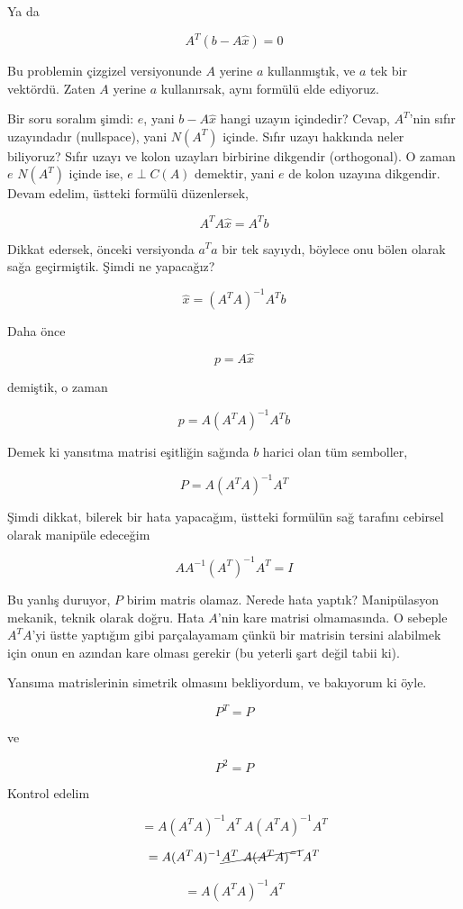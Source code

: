 \documentclass[12pt,fleqn]{article}\usepackage{../../common}
\begin{document}
Ya da

$$ A^T(b - A\hat{x})  = 0 $$

Bu problemin çizgizel versiyonunde $A$ yerine $a$ kullanmıştık, ve $a$ tek
bir vektördü. Zaten $A$ yerine $a$ kullanırsak, aynı formülü elde
ediyoruz. 

Bir soru soralım şimdi: $e$, yani $b - A\hat{x}$ hangi uzayın içindedir?
Cevap, $A^T$'nin sıfır uzayındadır (nullspace), yani $N(A^T)$ içinde. Sıfır
uzayı hakkında neler biliyoruz? Sıfır uzayı ve kolon uzayları birbirine
dikgendir (orthogonal). O zaman $e$ $N(A^T)$ içinde ise, $e \perp C(A)$
demektir, yani $e$ de kolon uzayına dikgendir. Devam edelim, üstteki
formülü düzenlersek,

$$ A^TA\hat{x} = A^Tb $$

Dikkat edersek, önceki versiyonda $a^Ta$ bir tek sayıydı, böylece onu
bölen olarak sağa geçirmiştik. Şimdi ne yapacağız? 

$$ \hat{x} = (A^TA)^{-1}A^Tb $$

Daha önce 

$$ p = A\hat{x} $$

demiştik, o zaman 

$$ p = A(A^TA)^{-1}A^Tb $$

Demek ki yansıtma matrisi eşitliğin sağında $b$ harici olan tüm semboller, 

$$ P = A(A^TA)^{-1}A^T $$

Şimdi dikkat, bilerek bir hata yapacağım, üstteki formülün sağ tarafını
cebirsel olarak manipüle edeceğim

$$  AA^{-1}(A^T)^{-1}A^T = I$$

Bu yanlış duruyor, $P$ birim matris olamaz. Nerede hata yaptık?
Manipülasyon mekanik, teknik olarak doğru. Hata $A$'nin kare matrisi
olmamasında. O sebeple $A^TA$'yi üstte yaptığım gibi parçalayamam çünkü
bir matrisin tersini alabilmek için onun en azından kare olması gerekir (bu
yeterli şart değil tabii ki). 

Yansıma matrislerinin simetrik olmasını bekliyordum, ve bakıyorum ki öyle. 

$$ P^T = P $$

ve 

$$ P^2 = P $$

Kontrol edelim

$$=  A(A^TA)^{-1}A^T \ A(A^TA)^{-1}A^T $$

$$=  A(A^TA)^{-1}\cancel{A^T \ A(A^TA)^{-1}}A^T $$

$$=  A(A^TA)^{-1}A^T $$
\end{document}

